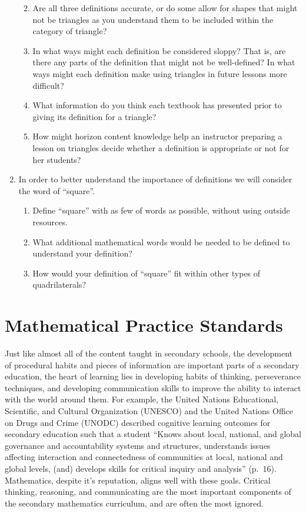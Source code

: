 \documentclass[
]{book}
\theoremstyle{definition}
\theoremstyle{definition}
\theoremstyle{definition}
\theoremstyle{definition}
\theoremstyle{remark}
\begin{document}
\begin{enumerate}
  \begin{enumerate}
  \def\labelenumii{\alph{enumii})}
  \item
    Are all three definitions accurate, or do some allow for shapes that might not be triangles as you understand them to be included within the category of triangle?
  \item
    In what ways might each definition be considered sloppy? That is, are there any parts of the definition that might not be well-defined? In what ways might each definition make using triangles in future lessons more difficult?
  \item
    What information do you think each textbook has presented prior to giving its definition for a triangle?
  \item
    How might horizon content knowledge help an instructor preparing a lesson on triangles decide whether a definition is appropriate or not for her students?
  \end{enumerate}
\item
  In order to better understand the importance of definitions we will consider the word of ``square''.

  \begin{enumerate}
  \def\labelenumii{\alph{enumii})}
  \item
    Define ``square'' with as few of words as possible, without using outside resources.
  \item
    What additional mathematical words would be needed to be defined to understand your definition?
  \item
    How would your definition of ``square'' fit within other types of quadrilaterals?
  \end{enumerate}
\end{enumerate}

\hypertarget{mathematical-practice-standards}{%
\section{Mathematical Practice Standards}\label{mathematical-practice-standards}}

Just like almost all of the content taught in secondary schools, the development of procedural habits and pieces of information are important parts of a secondary education, the heart of learning lies in developing habits of thinking, perseverance techniques, and developing communication skills to improve the ability to interact with the world around them. For example, the United Nations Educational, Scientific, and Cultural Organization (UNESCO) and the United Nations Office on Drugs and Crime (UNODC) \citeyearpar{UNESCO} described cognitive learning outcomes for secondary education such that a student ``Knows about local, national, and global governance and accountability systems and structures, understands issues affecting interaction and connectedness of communities at local, national and global levels, (and) develops skills for critical inquiry and analysis'' (p.~16). Mathematics, despite it's reputation, aligns well with these goals. Critical thinking, reasoning, and communicating are the most important components of the secondary mathematics curriculum, and are often the most ignored.
\end{document}
